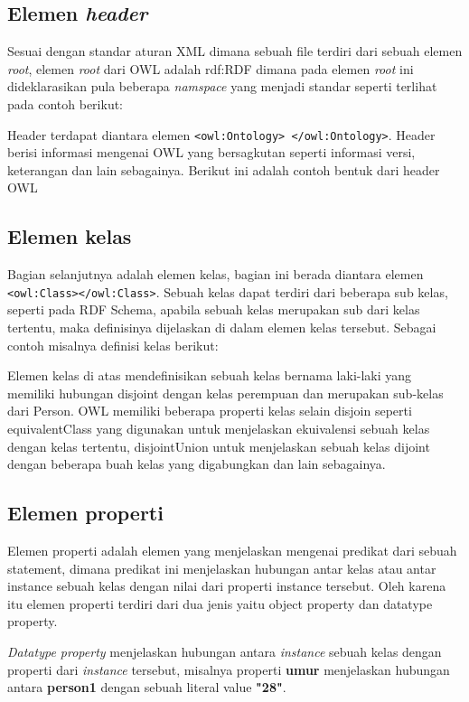 \subsection{Elemen \emph{header}}
Sesuai dengan standar aturan XML dimana sebuah file terdiri dari sebuah elemen \emph{root}, elemen \emph{root} dari OWL adalah rdf:RDF dimana pada elemen \emph{root} ini dideklarasikan pula beberapa \emph{namspace} yang menjadi standar seperti terlihat pada contoh berikut:


Header terdapat diantara elemen \texttt{<owl:Ontology> </owl:Ontology>}. Header berisi informasi mengenai OWL yang bersagkutan seperti informasi versi, keterangan dan lain sebagainya. Berikut ini adalah contoh bentuk dari header OWL


\subsection{Elemen kelas}
Bagian selanjutnya adalah elemen kelas, bagian ini berada diantara elemen \texttt{<owl:Class></owl:Class>}. Sebuah kelas dapat terdiri dari beberapa sub kelas, seperti pada RDF Schema, apabila sebuah kelas merupakan sub dari kelas tertentu, maka definisinya dijelaskan di dalam elemen kelas tersebut. Sebagai contoh misalnya definisi kelas berikut:


Elemen kelas di atas mendefinisikan sebuah kelas bernama laki-laki yang memiliki hubungan disjoint dengan kelas perempuan dan merupakan sub-kelas dari Person. OWL memiliki beberapa properti kelas selain disjoin seperti equivalentClass yang digunakan untuk menjelaskan ekuivalensi sebuah kelas dengan kelas tertentu, disjointUnion untuk menjelaskan sebuah kelas dijoint dengan beberapa buah kelas yang digabungkan dan lain sebagainya.

\subsection{Elemen properti}
Elemen properti adalah elemen yang menjelaskan mengenai predikat dari sebuah statement, dimana predikat ini menjelaskan hubungan antar kelas atau antar instance sebuah kelas dengan nilai dari properti instance tersebut. Oleh karena itu elemen properti terdiri dari dua jenis yaitu object property dan datatype property.

\emph{Datatype property} menjelaskan hubungan antara \textit{instance} sebuah kelas dengan properti dari \textit{instance} tersebut, misalnya properti \textbf{umur} menjelaskan hubungan antara \textbf{person1} dengan sebuah literal value \textbf{"28"}. 


